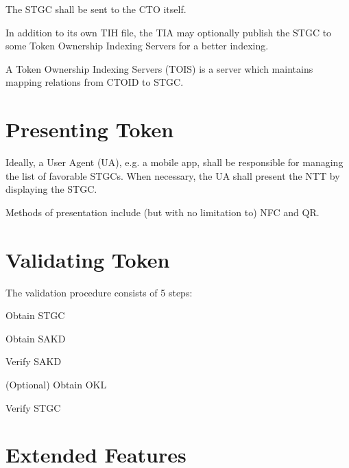 \documentclass[a4paper,10pt]{article}
\begin{document}
The STGC shall be sent to the CTO itself.

In addition to its own TIH file, the TIA may optionally publish the STGC to some Token Ownership Indexing Servers for a better indexing.

A Token Ownership Indexing Servers (TOIS) is a server which maintains mapping relations from CTOID to STGC.









\section{Presenting Token}

Ideally, a User Agent (UA), e.g. a mobile app, shall be responsible for managing the list of favorable STGCs.
When necessary, the UA shall present the NTT by displaying the STGC.

Methods of presentation include (but with no limitation to) NFC and QR.












\section{Validating Token}

The validation procedure consists of 5 steps:

\begin{compactenum}
    \item Obtain STGC
    \item Obtain SAKD
    \item Verify SAKD
    \item (Optional) Obtain OKL
    \item Verify STGC
\end{compactenum}











\section{Extended Features}
\end{document}
